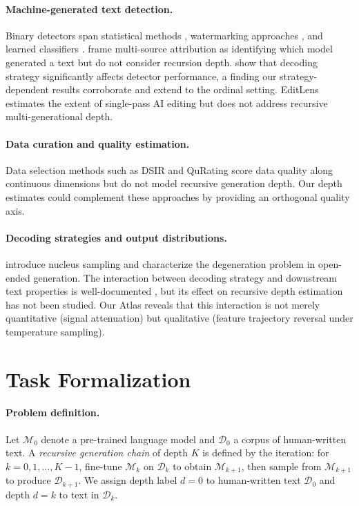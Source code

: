 \documentclass[11pt,a4paper]{article}
\begin{document}
\paragraph{Machine-generated text detection.}
Binary detectors span statistical methods \citep{hans2024binoculars,bao2024fastdetectgpt,mitchell2023detectgpt}, watermarking approaches \citep{kirchenbauer2023watermark}, and learned classifiers \citep{liang2024monitoring}. \citet{uchendu2020authorship} frame multi-source attribution as identifying which model generated a text but do not consider recursion depth. \citet{garcesarias2025decoding} show that decoding strategy significantly affects detector performance, a finding our strategy-dependent results corroborate and extend to the ordinal setting. EditLens \citep{wang2024editlens} estimates the extent of single-pass AI editing but does not address recursive multi-generational depth.

\paragraph{Data curation and quality estimation.}
Data selection methods such as DSIR \citep{xie2023dsir} and QuRating \citep{wettig2024qurating} score data quality along continuous dimensions but do not model recursive generation depth. Our depth estimates could complement these approaches by providing an orthogonal quality axis.

\paragraph{Decoding strategies and output distributions.}
\citet{holtzman2020curious} introduce nucleus sampling and characterize the degeneration problem in open-ended generation. The interaction between decoding strategy and downstream text properties is well-documented \citep{garcesarias2025decoding}, but its effect on recursive depth estimation has not been studied. Our Atlas reveals that this interaction is not merely quantitative (signal attenuation) but qualitative (feature trajectory reversal under temperature sampling).

\section{Task Formalization}

\paragraph{Problem definition.}
Let $\mathcal{M}_0$ denote a pre-trained language model and $\mathcal{D}_0$ a corpus of human-written text. A \emph{recursive generation chain} of depth $K$ is defined by the iteration: for $k = 0, 1, \ldots, K-1$, fine-tune $\mathcal{M}_k$ on $\mathcal{D}_k$ to obtain $\mathcal{M}_{k+1}$, then sample from $\mathcal{M}_{k+1}$ to produce $\mathcal{D}_{k+1}$. We assign depth label $d = 0$ to human-written text $\mathcal{D}_0$ and depth $d = k$ to text in $\mathcal{D}_k$.
\end{document}
